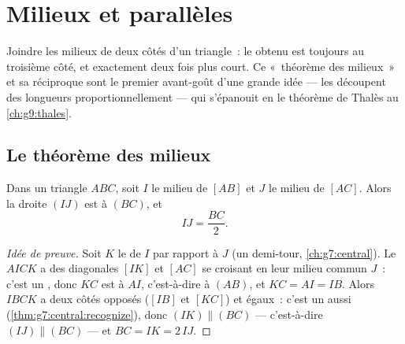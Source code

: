 \chapter{Milieux et parallèles}\label{ch:g8:midpoints}

Joindre les milieux de deux côtés d'un triangle~: le  obtenu
est toujours  au troisième côté, et exactement deux fois
plus court. Ce «~théorème des milieux~» et sa réciproque sont le
premier avant-goût d'une grande idée --- les  découpent des
longueurs proportionnellement --- qui s'épanouit en le théorème de
Thalès au \cref{ch:g9:thales}.

\section{Le théorème des milieux}

\begin{theorem}\label{thm:g8:midpoints:direct}
Dans un triangle $ABC$, soit $I$ le milieu de $[AB]$ et $J$ le milieu
de $[AC]$. Alors la droite $(IJ)$ est  à $(BC)$, et
\[
IJ = \frac{BC}{2} .
\]
\end{theorem}

\begin{proof}[Idée de preuve]
Soit $K$ le  de $I$ par rapport à $J$ (un demi-tour,
\cref{ch:g7:central}). Le  $AICK$ a des diagonales
$[IK]$ et $[AC]$ se croisant en leur milieu commun $J$~: c'est un
, donc $KC$ est  à $AI$, c'est-à-dire à
$(AB)$, et $KC = AI = IB$. Alors $IBCK$ a deux côtés opposés
($[IB]$ et $[KC]$)  et égaux~: c'est un 
aussi (\cref{thm:g7:central:recognize}), donc
$(IK) \parallel (BC)$ --- c'est-à-dire $(IJ) \parallel (BC)$ --- et
$BC = IK = 2\,IJ$.
\end{proof}

